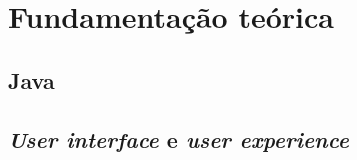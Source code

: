 \chapter{Fundamentação teórica}
\label{cap:fundamentacao-teorica}

\section{Java}
\label{sec:java}

\section{\textit{User interface} e \textit{user experience}}
\label{sec:user-interface-e-user-experience}

%
%
%
